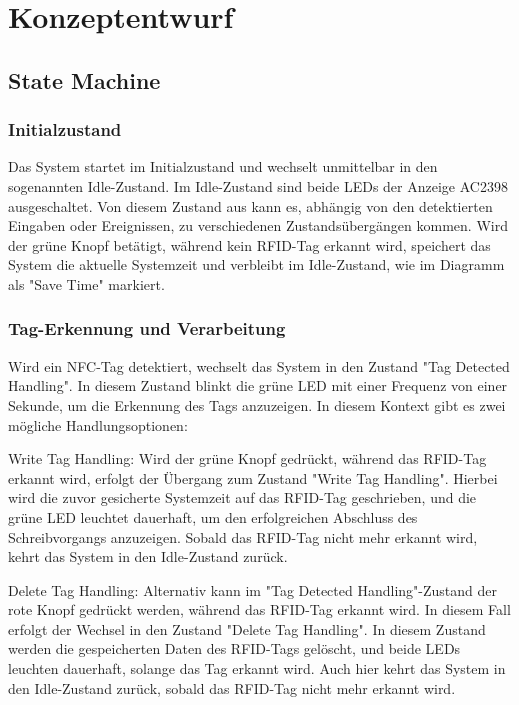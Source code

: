 \chapter*{Konzeptentwurf}
\label{cha:Konzeptentwurf}

\section*{State Machine}
\label{sec:State Machine}

\subsection*{Initialzustand}
\label{subsec:Initialzustand}

Das System startet im Initialzustand und wechselt unmittelbar in den sogenannten Idle-Zustand. Im Idle-Zustand sind beide LEDs der Anzeige AC2398 ausgeschaltet. Von diesem Zustand aus kann es, abhängig von den detektierten Eingaben oder Ereignissen, zu verschiedenen Zustandsübergängen kommen. Wird der grüne Knopf betätigt, während kein RFID-Tag erkannt wird, speichert das System die aktuelle Systemzeit und verbleibt im Idle-Zustand, wie im Diagramm als "Save Time" markiert.

\subsection*{Tag-Erkennung und Verarbeitung}
\label{subsec:Tag-ErkennungundVerarbeitung}

Wird ein NFC-Tag detektiert, wechselt das System in den Zustand "Tag Detected Handling". In diesem Zustand blinkt die grüne LED mit einer Frequenz von einer Sekunde, um die Erkennung des Tags anzuzeigen. In diesem Kontext gibt es zwei mögliche Handlungsoptionen:

Write Tag Handling: Wird der grüne Knopf gedrückt, während das RFID-Tag erkannt wird, erfolgt der Übergang zum Zustand "Write Tag Handling". Hierbei wird die zuvor gesicherte Systemzeit auf das RFID-Tag geschrieben, und die grüne LED leuchtet dauerhaft, um den erfolgreichen Abschluss des Schreibvorgangs anzuzeigen. Sobald das RFID-Tag nicht mehr erkannt wird, kehrt das System in den Idle-Zustand zurück.

Delete Tag Handling: Alternativ kann im "Tag Detected Handling"-Zustand der rote Knopf gedrückt werden, während das RFID-Tag erkannt wird. In diesem Fall erfolgt der Wechsel in den Zustand "Delete Tag Handling". In diesem Zustand werden die gespeicherten Daten des RFID-Tags gelöscht, und beide LEDs leuchten dauerhaft, solange das Tag erkannt wird. Auch hier kehrt das System in den Idle-Zustand zurück, sobald das RFID-Tag nicht mehr erkannt wird.

